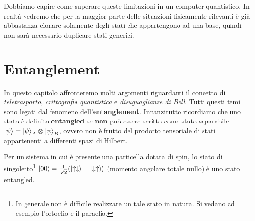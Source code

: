 \noindent Dobbiamo capire come superare queste limitazioni in un computer quantistico. In realtà vedremo che per la maggior parte delle situazioni fisicamente rilevanti è già abbastanza clonare solamente degli stati che appartengono ad una base, quindi non sarà necessario duplicare stati generici.  


\chapter{Entanglement}

In questo capitolo affronteremo molti argomenti riguardanti il concetto di \textit{teletrasporto}, \textit{crittografia quantistica} e \textit{disuguaglianze di Bell}. Tutti questi temi sono legati dal fenomeno dell'\textbf{entanglement}. Innanzitutto ricordiamo che uno stato è definito \textbf{entangled} se \textbf{non} può essere scritto come stato separabile $\ket{\psi} = \ket{\psi}_A \otimes \ket{\psi}_B$, ovvero non è frutto del prodotto tensoriale di stati appartenenti a differenti spazi di Hilbert. 

\begin{esempio}
    Per un sistema in cui è presente una particella dotata di spin, lo stato di singoletto\footnote{In generale non è difficile realizzare un tale stato in natura. Si vedano ad esempio l'ortoelio e il paraelio.} $\ket{00} = \frac{1}{\sqrt{2}} (\ket{\uparrow \downarrow} - \ket{\downarrow \uparrow})$ (momento angolare totale nullo) è uno stato entangled. 
\end{esempio}

